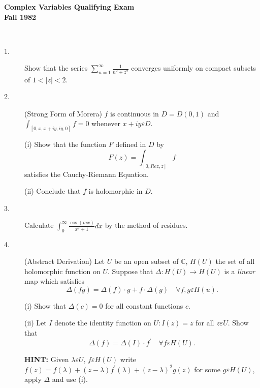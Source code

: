 \documentclass{article}
\def\C{\mathbb C}
\begin{document}






\begin{center}\begin{LARGE}
{\bf Complex Variables Qualifying Exam}\\ 
{\bf Fall 1982}\\ \end{LARGE}
\end{center}
\vspace{0.1in}
\noindent\hrulefill\\

\begin{description}
\item[1.]
Show that the series $\sum^\infty_{n=1} \frac{1}{n^2 + z^2}$
converges uniformly on compact subsets of $1 < |z| < 2$.

\item[2.]
(Strong Form of Morera) $f$ is continuous in $D=D(0,1)$
and $\int_{[0, x, x+ iy, iy, 0]} f=0$ whenever $x + iy \varepsilon D$.

\item[\quad] (i)
Show that the function $F$ defined in $D$ by
$$F(z) = \int_{[0, Rez, z]} f$$
satisfies the Cauchy-Riemann Equation.

\item[\quad] (ii)
Conclude that $f$ is holomorphic in $D$.

\item[3.]
Calculate $\int^\infty_0 \frac{\cos (mx)}{x^2 + 1} dx$ by the method of
residues.

\item[4.]
(Abstract Derivation) Let $U$ be an open subset of $\C$, $H(U)$ the set of
all holomorphic function on $U$. Suppose that
$\Delta : H(U) \to H(U)$ is a {\it linear} map which satisfies
$$\Delta (fg) = \Delta (f) \cdot g + f \cdot \Delta (g) \quad
  \forall f, g \varepsilon H(u).$$

\item[\quad] (i)
Show that $\Delta (c) = 0$ for all constant functions $c$.

\item[\quad] (ii)
Let $I$ denote the identity function on $U : I(z) = z$ for all
$z \varepsilon U$. Show that
$$\Delta (f) = \Delta (I) \cdot f^\prime \quad \forall f \varepsilon H(U).$$

{\bf HINT:} Given $\lambda \varepsilon U$, $f \varepsilon H(U)$
write $f(z) = f(\lambda) + (z-\lambda) f^\prime (\lambda) +
(z-\lambda)^2 g(z)$ for some $g \varepsilon H(U)$, apply $\Delta$ and use
(i).


\end{description}
\end{document}

